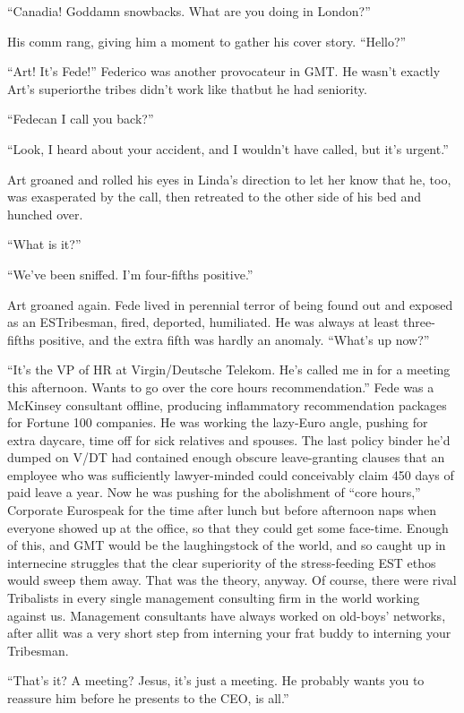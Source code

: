 “Canadia! Goddamn snowbacks. What are you doing in London?”

His comm rang, giving him a moment to gather his cover story.
“Hello?”

“Art! It’s Fede!” Federico was another provocateur in GMT. He
wasn’t exactly Art’s superior{\dash}the tribes didn’t work like that{\dash}but
he had seniority.

“Fede{\dash}can I call you back?”

“Look, I heard about your accident, and I wouldn’t have called, but
it’s urgent.”

Art groaned and rolled his eyes in Linda’s direction to let her
know that he, too, was exasperated by the call, then retreated to
the other side of his bed and hunched over.

“What is it?”

“We’ve been sniffed. I’m four-fifths positive.”

Art groaned again. Fede lived in perennial terror of being found
out and exposed as an ESTribesman, fired, deported, humiliated. He
was always at least three-fifths positive, and the extra fifth was
hardly an anomaly. “What’s up now?”

“It’s the VP of HR at Virgin/Deutsche Telekom. He’s called me in
for a meeting this afternoon. Wants to go over the core hours
recommendation.” Fede was a McKinsey consultant offline, producing
inflammatory recommendation packages for Fortune 100 companies. He
was working the lazy-Euro angle, pushing for extra daycare, time
off for sick relatives and spouses. The last policy binder he’d
dumped on V/DT had contained enough obscure leave-granting clauses
that an employee who was sufficiently lawyer-minded could
conceivably claim 450 days of paid leave a year. Now he was pushing
for the abolishment of “core hours,” Corporate Eurospeak for the
time after lunch but before afternoon naps when everyone showed up
at the office, so that they could get some face-time. Enough of
this, and GMT would be the laughingstock of the world, and so
caught up in internecine struggles that the clear superiority of
the stress-feeding EST ethos would sweep them away. That was the
theory, anyway. Of course, there were rival Tribalists in every
single management consulting firm in the world working against us.
Management consultants have always worked on old-boys’ networks,
after all{\dash}it was a very short step from interning your frat buddy
to interning your Tribesman.

“That’s it? A meeting? Jesus, it’s just a meeting. He probably
wants you to reassure him before he presents to the CEO, is all.”

